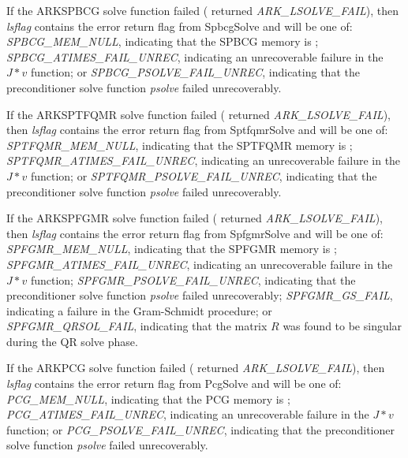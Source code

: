 \documentclass[letterpaper,10pt,english]{sphinxmanual}
\begin{document}
\begin{fulllineitems}
If the ARKSPBCG solve function failed ({\hyperref[c_interface/User_callable:c.ARKode]{\emph{}}}
returned \emph{ARK\_LSOLVE\_FAIL}), then \emph{lsflag} contains the error
return flag from SpbcgSolve and will be one of:
\emph{SPBCG\_MEM\_NULL}, indicating that the SPBCG memory is
; \emph{SPBCG\_ATIMES\_FAIL\_UNREC}, indicating an unrecoverable
failure in the \(J*v\) function; or
\emph{SPBCG\_PSOLVE\_FAIL\_UNREC}, indicating that the preconditioner
solve function \emph{psolve} failed unrecoverably.

If the ARKSPTFQMR solve function failed ({\hyperref[c_interface/User_callable:c.ARKode]{\emph{}}}
returned \emph{ARK\_LSOLVE\_FAIL}), then \emph{lsflag} contains the error
return flag from SptfqmrSolve and will be one of:
\emph{SPTFQMR\_MEM\_NULL}, indicating that the SPTFQMR memory is
; \emph{SPTFQMR\_ATIMES\_FAIL\_UNREC}, indicating an
unrecoverable failure in the \(J*v\) function; or
\emph{SPTFQMR\_PSOLVE\_FAIL\_UNREC}, indicating that the preconditioner
solve function \emph{psolve} failed unrecoverably.

If the ARKSPFGMR solve function failed ({\hyperref[c_interface/User_callable:c.ARKode]{\emph{}}}
returned \emph{ARK\_LSOLVE\_FAIL}), then \emph{lsflag} contains the error
return flag from SpfgmrSolve and will be one of:
\emph{SPFGMR\_MEM\_NULL}, indicating that the SPFGMR memory is
; \emph{SPFGMR\_ATIMES\_FAIL\_UNREC}, indicating an unrecoverable
failure in the \(J*v\) function; \emph{SPFGMR\_PSOLVE\_FAIL\_UNREC},
indicating that the preconditioner solve function \emph{psolve} failed
unrecoverably; \emph{SPFGMR\_GS\_FAIL}, indicating a failure in the
Gram-Schmidt procedure; or \emph{SPFGMR\_QRSOL\_FAIL}, indicating that
the matrix \(R\) was found to be singular during the QR solve
phase.

If the ARKPCG solve function failed ({\hyperref[c_interface/User_callable:c.ARKode]{\emph{}}}
returned \emph{ARK\_LSOLVE\_FAIL}), then \emph{lsflag} contains the error
return flag from PcgSolve and will be one of:
\emph{PCG\_MEM\_NULL}, indicating that the PCG memory is
; \emph{PCG\_ATIMES\_FAIL\_UNREC}, indicating an unrecoverable
failure in the \(J*v\) function; or
\emph{PCG\_PSOLVE\_FAIL\_UNREC}, indicating that the preconditioner
solve function \emph{psolve} failed unrecoverably.

\end{fulllineitems}

\end{document}
